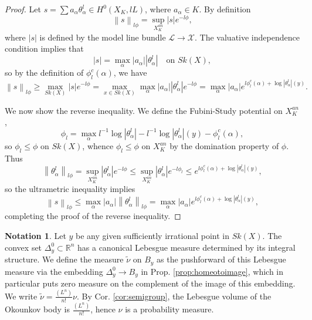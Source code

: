 \documentclass[a4paper]{article}
\theoremstyle{definition}
\newtheorem*{Notation}{Notation}
\newcommand{\R}{\mathbb{R}}
\newcommand{\norm}[1]{\left\lVert#1\right\rVert}
\begin{document}
	
	
	
	
	\begin{proof}
		Let $s=\sum a_\alpha \theta_\alpha^l\in H^0(X_K,lL)$, where $a_\alpha\in K$. By definition
		\[
		\norm{s}_{l\phi}= \sup_{X_K^{an}} |s| e^{-l\phi},
		\]
		where $|s|$ is defined by the model line bundle $\mathcal{L}\to \mathcal{X}$. The valuative independence condition implies that
		\[
		|s|= \max_{\alpha } |a_\alpha| |\theta_\alpha^l| \quad \text{on $Sk(X)$},
		\]
		so by the definition of $\phi^c_l(\alpha)$, we have
		\[
		\norm{s}_{l\phi} \geq \max_{Sk(X) }   |s| e^{-l\phi} =\max_{x\in Sk(X)} \max_\alpha |a_\alpha| |\theta_\alpha^l| e^{-l\phi} =\max_{\alpha } |a_\alpha| e^{ l\phi^c_l(\alpha)+ \log |\theta_\alpha^l|(y)}.
		\]
		
		
		
		We now show the reverse inequality. We define the Fubini-Study potential on $X_K^{an}$, 
		\[
		\phi_l=\max_{\alpha}  l^{-1} \log |\theta_\alpha^l|   - l^{-1} \log |\theta_\alpha^l|(y)  - \phi^c_l(\alpha),
		\]		
		so $\phi_l\leq \phi$ on $Sk(X)$, whence $\phi_l\leq \phi$ on $X_K^{an}$ by the domination property of $\phi$. Thus
		\[
		\norm{ \theta_\alpha^l}_{l\phi} =  \sup_{X_K^{an}} |\theta_\alpha^l|  e^{-l\phi}
		\leq \sup_{X_K^{an}} |\theta_\alpha^l|  e^{-l\phi_l}\leq e^{l\phi_l^c(\alpha)  + \log |\theta_\alpha^l|(y) },
		\]
		so the ultrametric inequality implies
		\[
		\norm{s}_{l\phi} \leq \max_\alpha |a_\alpha| \norm{\theta_\alpha^l}_{l\phi} =\max_ \alpha |a_\alpha | e^{l\phi_l^c(\alpha) + \log |\theta_\alpha^l|(y) },
		\]
		completing the proof of the reverse inequality. 
	\end{proof}
	
	
	
	
	
	\begin{Notation}
		Let $y$ be any given sufficiently irrational point in $Sk(X)$.
		The convex set $\Delta_y^0\subset \R^n$ has a canonical Lebesgue measure determined by its integral structure.
	We define the measure $\tilde{\nu}$ on $B_y$ as the pushforward of this Lebesgue measure via the embedding $\Delta_y^0\to B_y$ in Prop. \ref{prop:homeotoimage}, which in particular puts zero measure on the complement of the image of this embedding. We write $\tilde{\nu}= \frac{(L^n)}{n!} \nu$. By Cor. \ref{cor:semigroup}, the Lebesgue volume of the Okounkov body is $\frac{(L^n)}{n!}$, hence $\nu$ is a probability measure.
	\end{Notation}
	
\end{document}
